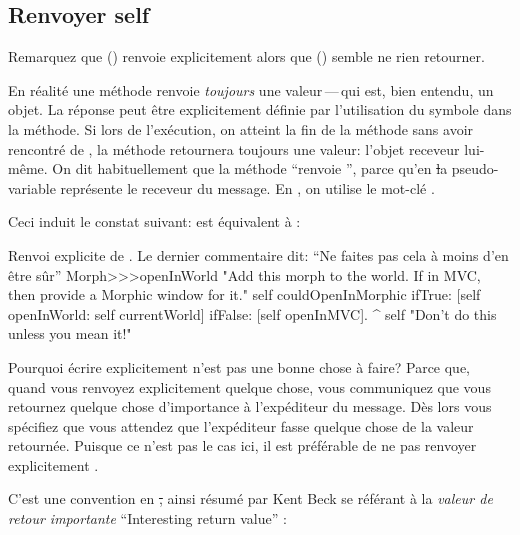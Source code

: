 \documentclass[a4paper,10pt,twoside]{book}
\begin{document}
\subsection{Renvoyer self}

Remarquez que  () renvoie explicitement  alors que  () semble ne rien retourner.

En r\'ealit\'e une m\'ethode renvoie \emph{toujours} une valeur\,---\,qui est, bien entendu, un objet.
La r\'eponse peut \^etre explicitement d\'efinie par l'utilisation du symbole \ct{^} dans la m\'ethode. Si lors de l'ex\'ecution, on atteint la fin de la m\'ethode sans avoir rencontr\'e de \ct{^}, la m\'ethode retournera toujours une valeur: l'objet receveur lui-m\^eme.
On dit habituellement que la m\'ethode ``renvoie \self'', parce qu'en
\st la pseudo-variable \self repr\'esente le receveur du message. En , on utilise le mot-cl\'e .

Ceci induit le constat suivant:  est \'equivalent \`a \mbox{:}

\begin{method}[openInWorldReturnSelf]{Renvoi explicite de \mbox{\self.} Le dernier commentaire dit: ``Ne faites pas cela \`a moins d'en \^etre s\^ur''}
Morph>>>openInWorld
	"Add this morph to the world.  If in MVC,
	then provide a Morphic window for it."
	self couldOpenInMorphic
		ifTrue: [self openInWorld: self currentWorld]
		ifFalse: [self openInMVC].
	^ self		"Don't do this unless you mean it!"
\end{method}

Pourquoi \'ecrire  explicitement n'est pas une bonne chose \`a faire?
Parce que, quand vous renvoyez explicitement quelque chose, vous communiquez
que vous retournez quelque chose d'importance \`a l'exp\'editeur du message.
D\`es lors vous sp\'ecifiez que vous attendez que l'exp\'editeur fasse quelque chose de la valeur retourn\'ee.
Puisque ce n'est pas le cas ici, il est pr\'ef\'erable de ne pas renvoyer explicitement \self.

C'est une convention en \st, ainsi r\'esum\'e par Kent Beck se r\'ef\'erant \`a la \emph{valeur de retour importante} ``Interesting return value'' \cite{Beck97a}:
\end{document}
